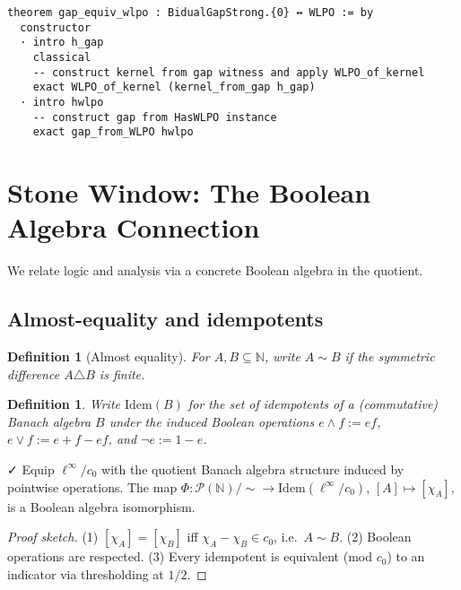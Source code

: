 \documentclass[11pt]{article}
\newtheorem{definition}[theorem]{Definition}
\newenvironment{defi}{\begin{definition}}{\end{definition}}
\newcommand{\leanok}{\textsf{\small \textcolor{green!70!black}{✓}}}
\newcommand{\N}{\mathbb{N}}
\newcommand{\linf}{\ell^\infty}
\newcommand{\cnull}{c_0}
\begin{document}
\begin{lstlisting}[caption={WLPO ↔ Gap (top-level equivalence)}]
theorem gap_equiv_wlpo : BidualGapStrong.{0} ↔ WLPO := by
  constructor
  · intro h_gap
    classical
    -- construct kernel from gap witness and apply WLPO_of_kernel
    exact WLPO_of_kernel (kernel_from_gap h_gap)
  · intro hwlpo
    -- construct gap from HasWLPO instance
    exact gap_from_WLPO hwlpo
\end{lstlisting}

\section{Stone Window: The Boolean Algebra Connection}\label{sec:stone}

We relate logic and analysis via a concrete Boolean algebra in the quotient.

\subsection{Almost-equality and idempotents}

\begin{defi}[Almost equality]
For $A,B\subseteq\N$, write $A\sim B$ if the symmetric difference $A\triangle B$ is finite.
\end{defi}

\begin{defi}
Write $\mathrm{Idem}(B)$ for the set of idempotents of a (commutative) Banach algebra $B$ under the induced Boolean operations $e\wedge f:=ef$, $e\vee f:=e+f-ef$, and $\neg e:=1-e$.
\end{defi}

\begin{thm}\label{thm:stone}\leanok
Equip $\ell^\infty/c_0$ with the quotient Banach algebra structure induced by pointwise operations. The map
$\Phi:\mathcal{P}(\N)/{\sim}\to \mathrm{Idem}(\linf/\cnull)$,
$[A]\mapsto [\chi_A]$, is a Boolean algebra isomorphism.
\end{thm}

\begin{proof}[Proof sketch]
(1) $[\chi_A]=[\chi_B]$ iff $\chi_A-\chi_B\in \cnull$, i.e.\ $A\sim B$.  
(2) Boolean operations are respected.  
(3) Every idempotent is equivalent (mod $\cnull$) to an indicator via thresholding at $1/2$.
\end{proof}
\end{document}
